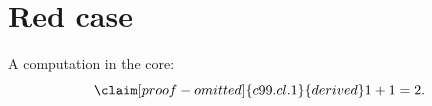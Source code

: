 \chapter{Red case}\label{c99}

A computation in the core:
\begin{equation}\label{c99.eq.eins}\claim[proof-omitted]{c99.cl.1}{derived}
  1 + 1 = 2.
\end{equation}

